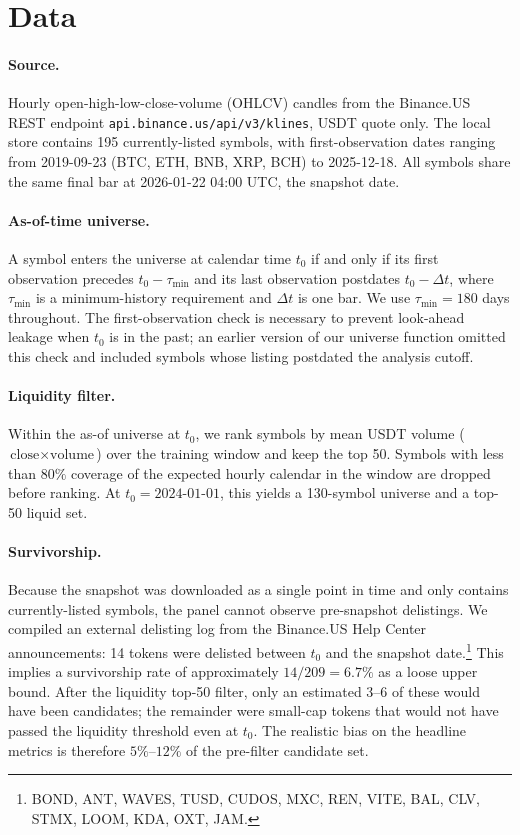 \documentclass[11pt]{article}
\begin{document}
\section{Data} \label{sec:data}

\paragraph{Source.} Hourly open-high-low-close-volume (OHLCV) candles
from the Binance.US REST endpoint \texttt{api.binance.us/api/v3/klines},
USDT quote only. The local store contains 195 currently-listed symbols,
with first-observation dates ranging from 2019-09-23 (BTC, ETH, BNB,
XRP, BCH) to 2025-12-18. All symbols share the same final bar at
2026-01-22 04:00 UTC, the snapshot date.

\paragraph{As-of-time universe.} A symbol enters the universe at
calendar time $t_0$ if and only if its first observation precedes
$t_0 - \tau_{\min}$ and its last observation postdates $t_0 - \Delta t$,
where $\tau_{\min}$ is a minimum-history requirement and $\Delta t$ is
one bar. We use $\tau_{\min} = 180$ days throughout. The first-observation
check is necessary to prevent look-ahead leakage when $t_0$ is in the
past; an earlier version of our universe function omitted this check
and included symbols whose listing postdated the analysis cutoff.

\paragraph{Liquidity filter.} Within the as-of universe at $t_0$, we
rank symbols by mean USDT volume ($\text{close} \times \text{volume}$)
over the training window and keep the top 50. Symbols with less than
$80\%$ coverage of the expected hourly calendar in the window are
dropped before ranking. At $t_0 = 2024\text{-}01\text{-}01$, this
yields a 130-symbol universe and a top-50 liquid set.

\paragraph{Survivorship.} Because the snapshot was downloaded as a
single point in time and only contains currently-listed symbols, the
panel cannot observe pre-snapshot delistings. We compiled an external
delisting log from the Binance.US Help Center announcements: 14 tokens
were delisted between $t_0$ and the snapshot date.\footnote{BOND, ANT,
WAVES, TUSD, CUDOS, MXC, REN, VITE, BAL, CLV, STMX, LOOM, KDA, OXT, JAM.}
This implies a survivorship rate of approximately $14 / 209 = 6.7\%$ as
a loose upper bound. After the liquidity top-50 filter, only an
estimated 3--6 of these would have been candidates; the remainder were
small-cap tokens that would not have passed the liquidity threshold
even at $t_0$. The realistic bias on the headline metrics is therefore
$5\%$--$12\%$ of the pre-filter candidate set.
\end{document}

